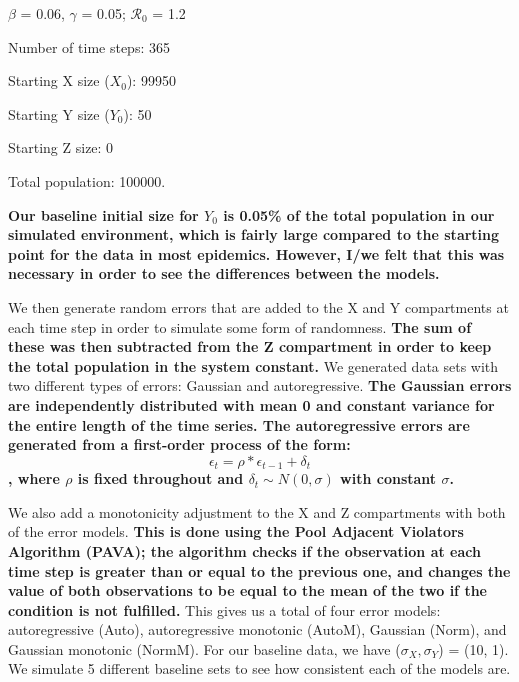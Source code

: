 \documentclass[12pt]{article}
\newcommand{\rr}{\ensuremath{\mathcal{R}_0}}
\begin{document}
\begin{center}
	
	$\beta$ = 0.06, $\gamma$ = 0.05; $\rr$ = 1.2
	
	Number of time steps: 365
	
	Starting X size ($X_0$): 99950
	
	Starting Y size ($Y_0$): 50
	
	Starting Z size: 0
	
	Total population: 100000.
	
\end{center}


\textbf{Our baseline initial size for $Y_0$ is 0.05\% of the total population in our simulated environment, which is fairly large compared to the starting point for the data in most epidemics. However, I/we felt that this was necessary in order to see the differences between the models.}

We then generate random errors that are added to the X and Y compartments at each time step in order to simulate some form of randomness. \textbf{The sum of these was then subtracted from the Z compartment in order to keep the total population in the system constant.} We generated data sets with two different types of errors: Gaussian and autoregressive. \textbf{The Gaussian errors are independently distributed with mean 0 and constant variance for the entire length of the time series. The autoregressive errors are generated from a first-order process of the form: $$ \epsilon_{t} = \rho * \epsilon_{t-1} + \delta_{t}$$, where $\rho$ is fixed throughout and $\delta_{t} \sim N(0, \sigma)$ with constant $\sigma$.} 

We also add a monotonicity adjustment to the X and Z compartments with both of the error models. \textbf{This is done using the Pool Adjacent Violators Algorithm (PAVA); the algorithm checks if the observation at each time step is greater than or equal to the previous one, and changes the value of both observations to be equal to the mean of the two if the condition is not fulfilled.} This gives us a total of four error models: autoregressive (Auto), autoregressive monotonic (AutoM), Gaussian (Norm), and Gaussian monotonic (NormM). For our baseline data, we have ($\sigma_X, \sigma_Y$) = (10, 1). We simulate 5 different baseline sets to see how consistent each of the models are.
\end{document}
